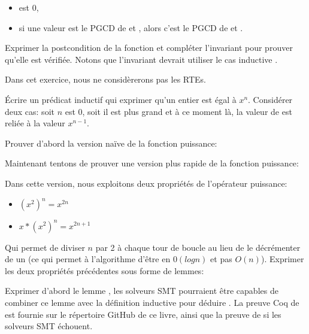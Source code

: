 \begin{itemize}
\item {} est 0,
\item si une valeur  est le PGCD de  et ,
      alors c'est le PGCD de  et .
\end{itemize}




Exprimer la postcondition de la fonction et compléter l'invariant pour prouver
qu'elle est vérifiée. Notons que l'invariant devrait utiliser le cas inductive
.





Dans cet exercice, nous ne considèrerons pas les RTEs.


Écrire un prédicat inductif qui exprimer qu'un entier  est égal
à $x^n$. Considérer deux cas: soit $n$ est 0, soit il est plus grand et à ce moment
là, la valeur de  est reliée à la valeur $x^{n-1}$.




Prouver d'abord la version naïve de la fonction puissance:




Maintenant tentons de prouver une version plus rapide de la fonction puissance:




Dans cette version, nous exploitons deux propriétés de l'opérateur puissance:


\begin{itemize}
\item $(x^2)^n = x^{2n}$
\item $x * (x^2)^n = x^{2n+1}$
\end{itemize}


Qui permet de diviser $n$ par 2 à chaque tour de boucle au lieu de le décrémenter
de un (ce qui permet à l'algorithme d'être en $0(log n)$ et pas $O(n)$). Exprimer
les deux propriétés précédentes sous forme de lemmes:




Exprimer d'abord le lemme , les solveurs SMT pourraient
être capables de combiner ce lemme avec la définition inductive pour déduire
. La preuve Coq de  est fournie
sur le répertoire GitHub de ce livre, ainsi que la preuve de 
si les solveurs SMT échouent.


